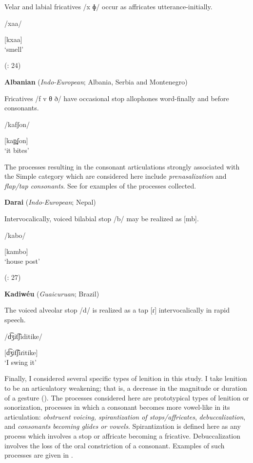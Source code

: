 Velar and labial fricatives /x ɸ/ occur as affricates utterance-initially.

/xaa/

[kxaa]\\
\glt ‘smell’

(\citealt{FranklinFranklin1978}: 24)
\z

\ea\label{ex:7.11}
  \textbf{Albanian} (\textit{Indo-European}; Albania, Serbia and Montenegro)

Fricatives /f v θ ð/ have occasional stop allophones word-finally and before consonants.

/kafʃon/

[kap̪ʃon]\\
\glt ‘it bites’
\citep[16]{Newmark1957}
\z

  The processes resulting in the consonant articulations strongly associated with the Simple category which are considered here include \textit{prenasalization} and \textit{flap/tap consonants}. See  for examples of the processes collected.

\ea\label{ex:7.12}
  \textbf{Darai} (\textit{Indo-European}; Nepal)

Intervocalically, voiced bilabial stop /b/ may be realized as [mb].

/kabo/

[kambo]\\
\glt ‘house post’

(\citealt{KotapishKotapish1973}: 27)
\z

\ea\label{ex:7.13}
  \textbf{Kadiwéu} (\textit{Guaicuruan}; Brazil)

The voiced alveolar stop /d/ is realized as a tap [ɾ] intervocalically in rapid speech.

/d͡ʒit͡ʃiditike/

[d͡ʒit͡ʃiɾitike]\\
\glt ‘I swing it’
\citep[16]{Sandalo1997}
\z

  Finally, I considered several specific types of lenition in this study. I take lenition to be an articulatory weakening; that is, a decrease in the magnitude or duration of a gesture (\citealt{BrowmanGoldstein1992b,MowreyPagliuca1995,BybeeEasterday2019}). The processes considered here are prototypical types of lenition or sonorization, processes in which a consonant becomes more vowel-like in its articulation: \textit{obstruent voicing, spirantization of stops/affricates}, \textit{debuccalization}, and \textit{consonants becoming glides or vowels}. Spirantization is defined here as any process which involves a stop or affricate becoming a fricative. Debuccalization involves the loss of the oral constriction of a consonant. Examples of such processes are given in .

